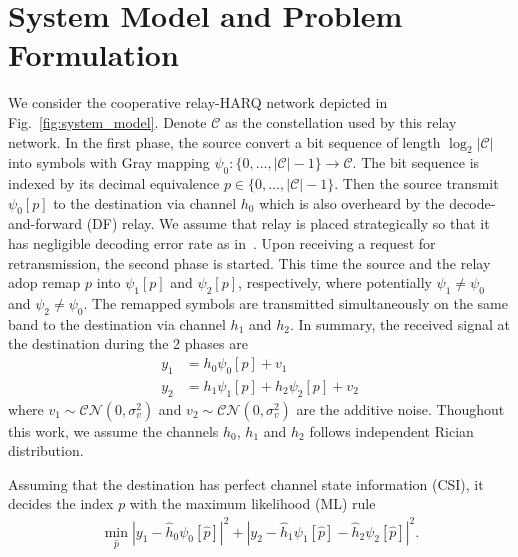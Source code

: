 \documentclass[conference]{IEEEtran}
\begin{document}
\section{System Model and Problem Formulation}
\label{sec:model}
We consider the cooperative relay-HARQ network depicted in
Fig.~\ref{fig:system_model}. Denote $\mathcal{C}$ as the constellation used by
this relay network. In the first phase, the source convert a bit
sequence of length $\log_2|\mathcal{C}|$ into symbols with Gray
mapping $\psi_0:
\{0,\ldots,|\mathcal{C}| - 1\}\rightarrow \mathcal{C}$. The bit sequence is
indexed by its decimal equivalence $p\in \{0,\ldots,|\mathcal{C}| - 1\}$.
Then the source transmit $\psi_0[p]$ to the destination via channel $h_0$
which is also overheard by the decode-and-forward (DF) relay.
We assume that relay is placed strategically so that it has
negligible decoding error rate as in~\cite{}. Upon receiving a request for
retransmission, the second phase is started. This time the source and the relay
adop remap $p$ into $\psi_1[p]$ and $\psi_2[p]$, respectively, where potentially
$\psi_1\not=\psi_0$ and $\psi_2\not=\psi_0$. The remapped symbols are
transmitted simultaneously on the same band to the destination via channel $h_1$
and $h_2$. In summary, the received signal at the destination
during the 2 phases are
\begin{subequations}
    \begin{align}
       y_1 & = h_0\psi_0[p] + v_1 \\
       y_2 & = h_1\psi_1[p] + h_2\psi_2[p] + v_2
    \end{align}
\end{subequations}
where $v_1\sim\mathcal{CN}(0,\sigma_v^2)$ and
$v_2\sim\mathcal{CN}(0,\sigma_v^2)$ are the additive noise. Thoughout this work,
we assume the channels $h_0$, $h_1$ and $h_2$ follows independent Rician
distribution.

Assuming that the destination has perfect channel state information (CSI), it
decides the index $p$ with the maximum likelihood (ML) rule
\begin{align}
    \min_{\hat{p}} |y_1 - \hat{h}_0\psi_0[\hat{p}]|^2 + |y_2-
    \hat{h}_1\psi_1[\hat{p}] - \hat{h}_2\psi_2[\hat{p}]|^2.
    \label{eq:ML}
\end{align}
\end{document}
